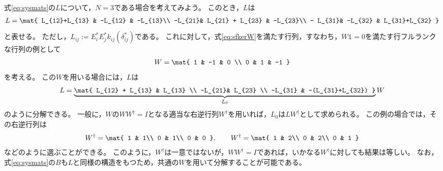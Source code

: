 \documentclass[tombow,dvipdfmx]{corona-a5}
\begin{document}
\begin{例}[同一の核空間をもつ行列による分解]\label{ex:Ldec}
式\ref{eq:sysmats}の$L$について，$N=3$である場合を考えてみよう。
このとき，$L$は
\begin{align*}
L=
\mat{
L_{12}+L_{13} & -L_{12} & -L_{13}\\
-L_{21}& L_{21} + L_{23} & -L_{23}\\
- L_{31}& -L_{32} & L_{31}+L_{32}
}
\end{align*}
と表せる。
ただし，$L_{ij}:= E_i^* E_j^* k_{ij}(\delta_{ij}^*)$である。
これに対して，式\ref{eq:sfkerW}を満たす行列，すなわち，$W \mathds{1}=0$を満たす行フルランクな行列の例として
\begin{align*}
W=\mat{
1 & -1 & 0 \\
0 & 1 & -1
}
\end{align*}
を考える。
この$W$を用いる場合には，$L$は
\begin{align*}
L = \underbrace{
\mat{
L_{12} + L_{13} & L_{13} \\
-L_{21}& L_{23} \\
-L_{31} & -(L_{31}+L_{32})
}
}_{L_0}
W
\end{align*}
のように分解できる。
一般に，$W$の$WW^{\dagger}=I$となる適当な右逆行列$W^{\dagger}$を用いれば，$L_0$は$LW^{\dagger}$として求められる。
この例の場合では，その右逆行列は
\begin{align*}
W^{\dagger} = \mat{
1 & 1\\
0 & 1\\
0 & 0
}
,\qquad
W^{\dagger} = \mat{
1 & 2\\
0 & 2\\
0 & 1
}
\end{align*}
などのように選ぶことができる。
このように，$W^{\dagger}$は一意ではないが，$WW^{\dagger}=I$であれば，いかなる$W^{\dagger}$に対しても結果は等しい。
なお，式\ref{eq:sysmats}の$B$も$L$と同様の構造をもつため，共通の$W$を用いて分解することが可能である。
\end{例}
\end{document}

